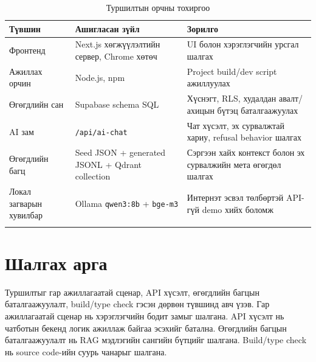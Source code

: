 \begin{longtable}{|p{}|p{}|p{}|}
  \hline
  \textbf{Түвшин} & \textbf{Ашигласан зүйл} & \textbf{Зорилго} \\ \hline
  Фронтенд & Next.js хөгжүүлэлтийн сервер, Chrome хөтөч & UI болон хэрэглэгчийн урсгал шалгах \\ \hline
  Ажиллах орчин & Node.js, npm & Project build/dev script ажиллуулах \\ \hline
  Өгөгдлийн сан & Supabase schema SQL & Хүснэгт, RLS, худалдан авалт/ахицын бүтэц баталгаажуулах \\ \hline
  AI зам & \texttt{/api/ai-chat} & Чат хүсэлт, эх сурвалжтай хариу, refusal behavior шалгах \\ \hline
  Өгөгдлийн багц & Seed JSON + generated JSONL + Qdrant collection & Сэргээн хайх контекст болон эх сурвалжийн мета өгөгдөл шалгах \\ \hline
  Локал загварын хувилбар & Ollama \texttt{qwen3:8b} + \texttt{bge-m3} & Интернэт эсвэл төлбөртэй API-гүй demo хийх боломж \\ \hline
  \caption{Туршилтын орчны тохиргоо}
  \label{tab:ch4-test-env}
\end{longtable}

\section{Шалгах арга}
Туршилтыг гар ажиллагаатай сценар, API хүсэлт, өгөгдлийн багцын баталгаажуулалт, build/type check гэсэн дөрвөн түвшинд авч үзэв. Гар ажиллагаатай сценар нь хэрэглэгчийн бодит замыг шалгана. API хүсэлт нь чатботын бекенд логик ажиллаж байгаа эсэхийг батална. Өгөгдлийн багцын баталгаажуулалт нь RAG мэдлэгийн сангийн бүтцийг шалгана. Build/type check нь source code-ийн суурь чанарыг шалгана.

